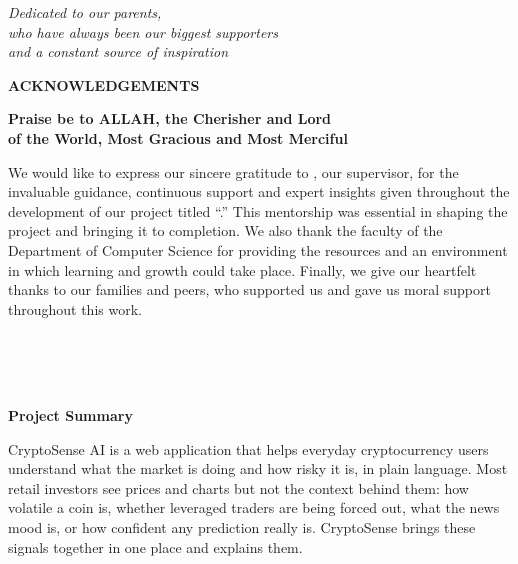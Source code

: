 \vspace*{\fill}
\begin{center}
{\Large\itshape Dedicated to our parents,\\[8pt] who have always been our biggest supporters\\[8pt] and a constant source of inspiration\par}
\end{center}
\vspace*{\fill}
\clearpage

\begin{center}
{\LARGE\bfseries ACKNOWLEDGEMENTS\par}\vspace{0.4cm}
{\large\bfseries Praise be to ALLAH, the Cherisher and Lord\\ of the World, Most Gracious and Most Merciful\par}
\end{center}
\vspace{0.3cm}
We would like to express our sincere gratitude to \supervisor, our supervisor, for the invaluable guidance, continuous support and expert insights given throughout the development of our project titled ``\projecttitleinline.'' This mentorship was essential in shaping the project and bringing it to completion. We also thank the faculty of the Department of Computer Science for providing the resources and an environment in which learning and growth could take place. Finally, we give our heartfelt thanks to our families and peers, who supported us and gave us moral support throughout this work.
\vspace{1.5cm}
\begin{flushright}
\studentA\\ \regA\\[1cm]
\studentB\\ \regB
\end{flushright}
\clearpage

\begin{center}{\LARGE\bfseries Project Summary}\end{center}
\vspace{0.2cm}
CryptoSense AI is a web application that helps everyday cryptocurrency users understand what the market is doing and how risky it is, in plain language. Most retail investors see prices and charts but not the context behind them: how volatile a coin is, whether leveraged traders are being forced out, what the news mood is, or how confident any prediction really is. CryptoSense brings these signals together in one place and explains them.

